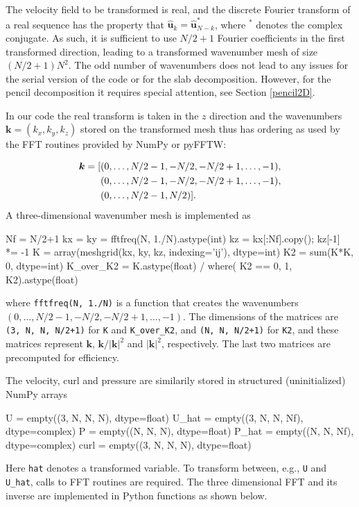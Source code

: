 \documentclass[final,3p,times,twocolumn]{elsarticle}
\newcommand{\inpyth}{\lstinline[style=inlinestyle]}
\begin{document}
The velocity field to be transformed is real, and the discrete Fourier transform of a real sequence has the property that $\hat{\bm{u}}_k = \hat{\bm{u}}_{N-k}^*$, where $^*$ denotes the complex conjugate. As such, it is sufficient to use $N/2+1$ Fourier coefficients in the first transformed direction, leading to a transformed wavenumber mesh of size $(N/2+1)N^2$. The odd number of wavenumbers does not lead to any issues for the serial version of the code or for the slab decomposition. However, for the pencil decomposition it requires special attention, see Section \ref{pencil2D}.

In our code the real transform is taken in the $z$ direction and the 
wavenumbers $\bm{k}=(k_x, k_y, k_z)$ stored on the transformed mesh thus has 
ordering as used by the FFT routines provided by NumPy or pyFFTW:

\begin{align}
  \bm{k} = [&(0, \ldots, N/2-1, -N/2, -N/2+1, \ldots, -1), \notag \\
   &(0, \ldots, N/2-1, -N/2, -N/2+1, \ldots, -1),  \notag \\
  &(0, \ldots, N/2-1, N/2)].
\end{align}
A three-dimensional wavenumber mesh is implemented as

\noindent
\begin{minipage}[l]{\columnwidth}
\begin{python}
Nf = N/2+1
kx = ky = fftfreq(N, 1./N).astype(int)
kz = kx[:Nf].copy(); kz[-1] *= -1
K = array(meshgrid(kx, ky, kz, 
          indexing='ij'), dtype=int)
K2 = sum(K*K, 0, dtype=int)
K_over_K2 = K.astype(float) / where(
            K2 == 0, 1, K2).astype(float)
\end{python}
\end{minipage}
where \inpyth{fftfreq(N, 1./N)} is a function that creates the wavenumbers $(0, 
\ldots, N/2-1, -N/2, -N/2+1, \ldots, -1)$. The dimensions of the matrices are 
\inpyth{(3, N, N, N/2+1)} for \texttt{K} and \texttt{K\_over\_K2}, and 
\inpyth{(N, N, N/2+1)} for \texttt{K2}, and these matrices represent $\bm{k}$, 
$\bm{k}/|\bm{k}|^2$ and $|\bm{k}|^2$, respectively. The last two matrices are 
precomputed for efficiency.

The velocity, curl and pressure are similarily stored in structured 
(uninitialized) NumPy arrays

\begin{python}
U     = empty((3, N, N, N),  dtype=float)
U_hat = empty((3, N, N, Nf), dtype=complex)
P     = empty((N, N, N),     dtype=float)
P_hat = empty((N, N, Nf),    dtype=complex)
curl  = empty((3, N, N, N),  dtype=float)
\end{python}
Here \inpyth{hat} denotes a transformed variable. To transform between, e.g., 
\inpyth{U} and \inpyth{U_hat}, calls to FFT routines are required. The three 
dimensional FFT and its inverse are implemented in Python functions as shown 
below.
\end{document}
